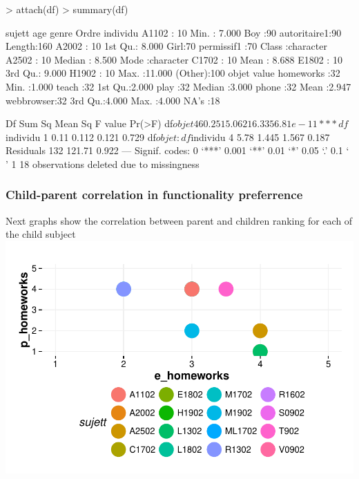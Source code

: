 \documentclass{article}
\begin{document}
\begin{Schunk}
\begin{Sinput}
> attach(df)
> summary(df)
\end{Sinput}
\begin{Soutput}
     sujett         age          genre             Ordre      individu        
 A1102  : 10   Min.   : 7.000   Boy :90   autoritaire1:90   Length:160        
 A2002  : 10   1st Qu.: 8.000   Girl:70   permissif1  :70   Class :character  
 A2502  : 10   Median : 8.500                               Mode  :character  
 C1702  : 10   Mean   : 8.688                                                 
 E1802  : 10   3rd Qu.: 9.000                                                 
 H1902  : 10   Max.   :11.000                                                 
 (Other):100                                                                  
        objet        value      
 homeworks :32   Min.   :1.000  
 teach     :32   1st Qu.:2.000  
 play      :32   Median :3.000  
 phone     :32   Mean   :2.947  
 webbrowser:32   3rd Qu.:4.000  
                 Max.   :4.000  
                 NA's   :18     
\end{Soutput}
\begin{Soutput}
                      Df Sum Sq Mean Sq F value   Pr(>F)    
df$objet               4  60.25  15.062  16.335 6.81e-11 ***
df$individu            1   0.11   0.112   0.121    0.729    
df$objet:df$individu   4   5.78   1.445   1.567    0.187    
Residuals            132 121.71   0.922                     
---
Signif. codes:  0 ‘***’ 0.001 ‘**’ 0.01 ‘*’ 0.05 ‘.’ 0.1 ‘ ’ 1
18 observations deleted due to missingness
\end{Soutput}
\end{Schunk}

\subsubsection{Child-parent correlation in functionality preferrence} 
Next graphs show the correlation between parent and children ranking for each of the child subject\newline
\includegraphics{interviews-plot_coirs_parent_enfant_hmk}
\end{document}

